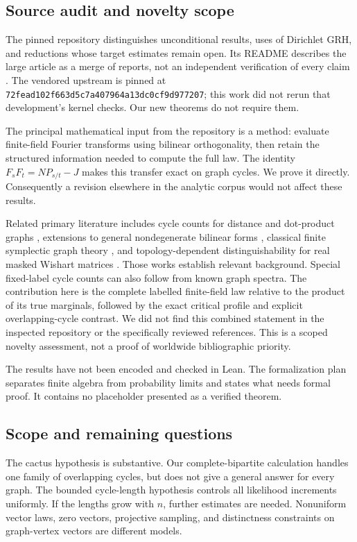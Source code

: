 \subsection{Source audit and novelty scope}
The pinned repository distinguishes unconditional results, uses of Dirichlet
GRH, and reductions whose target estimates remain open. Its README describes
the large article as a merge of reports, not an independent verification of
every claim \cite{ProveItReadme}. The vendored upstream is pinned at
\texttt{72fead102f663d5c7a407964a13dc0cf9d977207}; this work did not rerun that
development's kernel checks. Our new theorems do not require them.

The principal mathematical input from the repository is a method: evaluate
finite-field Fourier transforms using bilinear orthogonality, then retain
the structured information needed to compute the full law. The identity
$F_sF_t=NP_{s/t}-J$ makes this transfer exact on graph cycles. We prove it
directly. Consequently a revision elsewhere in the analytic corpus would not
affect these results.

Related primary literature includes cycle counts for distance and dot-product
graphs \cite{IJM}, extensions to general nondegenerate bilinear forms
\cite{Bright}, classical finite symplectic graph theory \cite{TangWan}, and
topology-dependent distinguishability for real masked Wishart matrices
\cite{BBH}. Those works establish relevant background. Special fixed-label cycle
counts can also follow from known graph spectra. The contribution here is the
complete labelled finite-field law relative to the product of its true
marginals, followed by the exact critical profile and explicit overlapping-cycle
contrast. We did not find this combined statement in the inspected repository
or the specifically reviewed references. This is a scoped novelty assessment,
not a proof of worldwide bibliographic priority.

The results have not been encoded and checked in Lean. The formalization plan
separates finite algebra from probability limits and states what needs formal
proof. It contains no placeholder presented as a verified theorem.

\subsection{Scope and remaining questions}
The cactus hypothesis is substantive. Our complete-bipartite calculation handles
one family of overlapping cycles, but does not give a general answer for every
graph. The bounded cycle-length hypothesis controls all likelihood increments
uniformly. If the lengths grow with $n$, further estimates are needed.
Nonuniform vector laws, zero vectors, projective sampling, and distinctness
constraints on graph-vertex vectors are different models.

